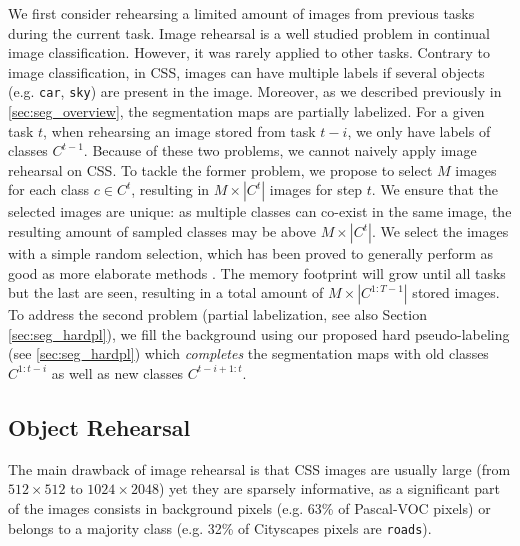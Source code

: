 We first consider rehearsing a limited amount of images from previous tasks during the current task.
Image rehearsal is a well studied problem in continual image classification. However, it was rarely
applied to other tasks. Contrary to image classification, in \ac{CSS}, images can have multiple labels if
several objects (e.g. \texttt{car}, \texttt{sky}) are present in the image. Moreover, as we
described previously in \autoref{sec:seg_overview}, the segmentation maps are partially labelized. For a
given task $t$, when rehearsing an image stored from task $t-i$, we only have labels of classes
$C^{t-1}$. Because of these two problems, we cannot naively apply image rehearsal on \ac{CSS}. To tackle
the former problem, we propose to select $M$ images for each class $c \in C^t$, resulting in $M
    \times |C^t|$ images for step $t$. We ensure that the selected images are unique: as multiple
classes can co-exist in the same image, the resulting amount of sampled classes may be above $M
    \times |C^t|$. We select the images with a simple random selection, which has been proved to
generally perform as good as more elaborate methods \citep{castro2018end_to_end_inc_learn}. The
memory footprint will grow until all tasks but the last are seen, resulting in a total amount of $M
    \times |C^{1:T-1}|$ stored images. To address the second problem (partial labelization, see also
Section \ref{sec:seg_hardpl}), we fill the background using our proposed hard pseudo-labeling (see
\autoref{sec:seg_hardpl}) which \textit{completes} the segmentation maps with old classes
$C^{1:t-i}$ as well as new classes $C^{t-i+1:t}$.

\subsection{Object Rehearsal}
\label{sec:seg_object_rehearsal}

The main drawback of image rehearsal is that \ac{CSS} images are usually large (from $512\times 512$ to
$1024 \times 2048$) yet they are sparsely informative, as a significant part of the images consists
in background pixels \citep{lin2017focalloss} (e.g. 63\% of Pascal-VOC \citep{everingham2015pascalvoc}
pixels) or belongs to a majority class (e.g. 32\% of Cityscapes \citep{cordts2016cityscapes} pixels
are \texttt{roads}).

